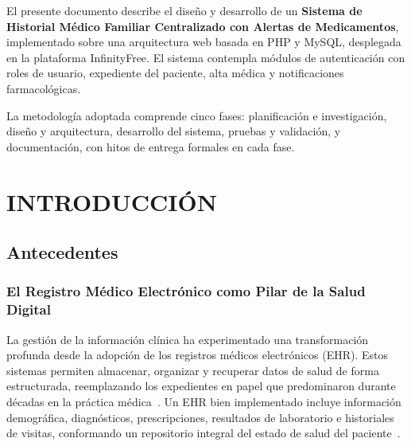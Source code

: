 \documentclass[12pt, letterpaper]{report}
\begin{document}
El presente documento describe el diseño y desarrollo de un \textbf{Sistema de Historial
Médico Familiar Centralizado con Alertas de Medicamentos}, implementado sobre una
arquitectura web basada en PHP y MySQL, desplegada en la plataforma InfinityFree.
El sistema contempla módulos de autenticación con roles de usuario, expediente del
paciente, alta médica y notificaciones farmacológicas.

La metodología adoptada comprende cinco fases: planificación e investigación, diseño y
arquitectura, desarrollo del sistema, pruebas y validación, y documentación, con hitos de
entrega formales en cada fase.


\tableofcontents
\newpage

\listoftables
{} %
\newpage

\listoffigures
{} %
\newpage

\setcounter{page}{1}

\chapter{INTRODUCCIÓN}

\section{Antecedentes}

\subsection{El Registro Médico Electrónico como Pilar de la Salud Digital}

La gestión de la información clínica ha experimentado una transformación profunda desde
la adopción de los registros médicos electrónicos (EHR). Estos sistemas permiten
almacenar, organizar y recuperar datos de salud de forma estructurada, reemplazando
los expedientes en papel que predominaron durante décadas en la práctica
médica~\cite{tsai2020effects}. Un EHR bien implementado incluye información
demográfica, diagnósticos, prescripciones, resultados de laboratorio e historiales de
visitas, conformando un repositorio integral del estado de salud del paciente~\cite{hayrinen2008definition}.
\end{document}
